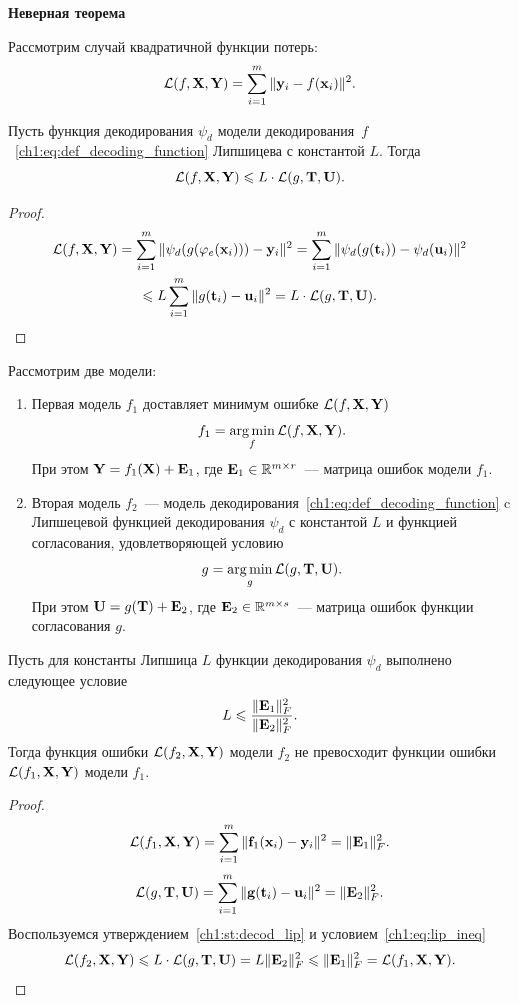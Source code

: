 \hrulefill

\textbf{Неверная теорема}

Рассмотрим случай квадратичной функции потерь:
\[
\mathcal{L}(f, \mathbf{X}, \mathbf{Y}) = \sum_{i=1}^m \| \mathbf{y}_i - f(\mathbf{x}_i) \|^2.
\]

\begin{statement}
	\label{ch1:st:decod_lip}
	Пусть функция декодирования $\psi_d$ модели декодирования~$f$~\eqref{ch1:eq:def_decoding_function} Липшицева с константой $L$. Тогда 
	\[
		\mathcal{L}(f, \mathbf{X}, \mathbf{Y}) \leqslant L \cdot \mathcal{L}(g, \mathbf{T}, \mathbf{U}).
	\]
\end{statement}

\begin{proof}
	\begin{multline*}
		\mathcal{L}(f, \mathbf{X}, \mathbf{Y}) = \sum_{i=1}^m \| \psi_d (g (\varphi_e(\mathbf{x}_i))) - \mathbf{y}_i \|^2  = \sum_{i=1}^m \| \psi_d (g (\mathbf{t}_i)) - \psi_d (\mathbf{u}_i) \|^2 \\\leqslant L \sum_{i=1}^m \| g (\mathbf{t}_i) - \mathbf{u}_i \|^2 = L \cdot \mathcal{L}(g, \mathbf{T}, \mathbf{U}).
	\end{multline*}
\end{proof}
\begin{theorem}
	Рассмотрим две модели:
	\begin{enumerate}
		\item Первая модель $f_1$ доставляет минимум ошибке $\mathcal{L}(f, \mathbf{X}, \mathbf{Y})$
		\[
		f_1 = \mathop{\arg \min}\limits_f \mathcal{L}(f, \mathbf{X}, \mathbf{Y}).
		\]
		При этом $\mathbf{Y} = f_1(\mathbf{X}) + \mathbf{E}_1$, где $\mathbf{E}_1 \in \mathbb{R}^{m \times r}$~--- матрица ошибок модели $f_1$.
		
		\item Вторая модель $f_2$~--- модель декодирования~\eqref{ch1:eq:def_decoding_function} c Липшецевой функцией декодирования $\psi_d$ с константой $L$ и функцией согласования, удовлетворяющей условию
		\[
			g = \mathop{\arg \min}\limits_g \mathcal{L}(g, \mathbf{T}, \mathbf{U}).
		\]
		При этом $\mathbf{U} = g(\mathbf{T}) + \mathbf{E}_2$, где $\mathbf{E}_2 \in \mathbb{R}^{m \times s}$~--- матрица ошибок функции согласования $g$.
	\end{enumerate}
	Пусть для константы Липшица $L$ функции декодирования $\psi_d$ выполнено следующее условие
	\begin{equation}
		L \leqslant \frac{\|\mathbf{E}_1\|_F^2}{\|\mathbf{E}_2\|_F^2}.
		\label{ch1:eq:lip_ineq}
	\end{equation}
	Тогда функция ошибки $\mathcal{L}(f_2, \mathbf{X}, \mathbf{Y})$ модели $f_2$ не превосходит функции ошибки $\mathcal{L}(f_1, \mathbf{X}, \mathbf{Y})$ модели $f_1$.
\end{theorem}

\begin{proof}
	\[
		\mathcal{L} (f_1, \mathbf{X}, \mathbf{Y}) = \sum_{i=1}^m \| \mathbf{f}_1(\mathbf{x}_i) - \mathbf{y}_i\|^2 = \| \mathbf{E}_1 \|_F^2.
	\]
	\[
	\mathcal{L} (g, \mathbf{T}, \mathbf{U}) = \sum_{i=1}^m \| \mathbf{g}(\mathbf{t}_i) - \mathbf{u}_i\|^2 = \| \mathbf{E}_2 \|_F^2.
	\]
	Воспользуемся утверждением~\ref{ch1:st:decod_lip} и условием~\eqref{ch1:eq:lip_ineq}
	\[
		\mathcal{L} (f_2, \mathbf{X}, \mathbf{Y}) \leqslant L \cdot \mathcal{L}(g, \mathbf{T}, \mathbf{U}) = L \| \mathbf{E}_2 \|_F^2 \leqslant \| \mathbf{E}_1 \|_F^2 = \mathcal{L}(f_1, \mathbf{X}, \mathbf{Y}).
	\]
\end{proof}


